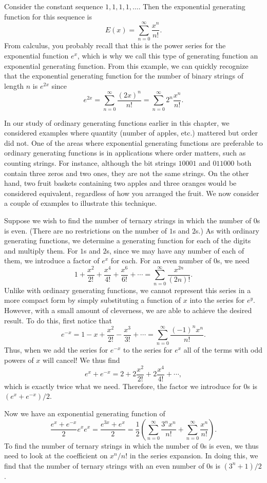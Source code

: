 \begin{example}
  Consider the constant sequence $1, 1, 1, 1, \dots$. Then the
  exponential generating function for this sequence is 
  \[E(x) = \sum_{n=0}^\infty \frac{x^n}{n!}.\]
  From calculus, you probably recall that this is the power series for
  the exponential function $e^x$, which is why we call this type of
  generating function an exponential generating function. From this
  example, we can quickly recognize that the exponential generating
  function for the number of binary strings of length $n$ is $e^{2x}$
  since
  \[e^{2x} = \sum_{n=0}^\infty \frac{(2x)^n}{n!} = \sum_{n=0}^\infty
  2^n\frac{x^n}{n!}.\]
\end{example}

In our study of ordinary generating functions earlier in this chapter,
we considered examples where quantity (number of apples, etc.)
mattered but order did not. One of the areas where exponential
generating functions are preferable to ordinary generating functions
is in applications where order matters, such as counting
strings. For instance, although the bit strings $10001$ and $011000$
both contain three zeros and two ones, they are not the same
strings. On the other hand, two fruit baskets containing two apples
and three oranges would be considered equivalent, regardless of how
you arranged the fruit. We now consider a couple of examples to
illustrate this technique.

\begin{example}
  Suppose we wish to find the number of ternary strings in which the
  number of $0$s is even. (There are no restrictions on the number of
  $1$s and $2$s.) As with ordinary generating functions, we determine
  a generating function for each of the digits and multiply them. For
  $1$s and $2$s, since we may have any number of each of them, we
  introduce a factor of $e^x$ for each. For an even number of $0$s,
  we need
  \[1 + \frac{x^2}{2!} + \frac{x^4}{4!} + \frac{x^6}{6!} + \cdots =
  \sum_{n=0}^\infty \frac{x^{2n}}{(2n)!}.\]
  Unlike with ordinary generating functions, we cannot represent this
  series in a more compact form by simply substituting a function of
  $x$ into the series for $e^y$. However, with a small amount of
  cleverness, we are able to achieve the desired result. To do this,
  first notice that
  \[e^{-x} = 1 - x + \frac{x^2}{2!} - \frac{x^3}{3!} + \cdots =
  \sum_{n=0}^\infty \frac{(-1)^nx^n}{n!}.\]
  Thus, when we add the series for $e^{-x}$ to the series for $e^x$
  all of the terms with odd powers of $x$ will cancel! We thus find
  \[e^x+e^{-x} = 2+2\frac{x^2}{2!} + 2\frac{x^4}{4!} + \cdots,\]
  which is exactly twice what we need. Therefore, the factor we introduce
  for $0$s is $(e^x+e^{-x})/2$.

  Now we have an exponential generating function of 
  \[\frac{e^x+e^{-x}}{2}e^x e^x = \frac{e^{3x} + e^x}{2} =
  \frac{1}{2}\left(\sum_{n=0}^\infty \frac{3^nx^n}{n!} +
    \sum_{n=0}^\infty \frac{x^n}{n!}\right).\] To find the number of
  ternary strings in which the number of $0$s is even, we thus need to
  look at the coefficient on $x^n/n!$ in the series expansion. In
  doing this, we find that the number of ternary strings with an even
  number of $0$s is $(3^n+1)/2$.
\end{example}

